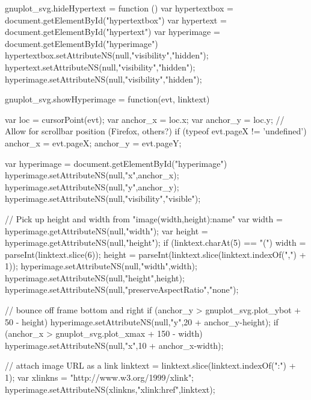 gnuplot_svg.hideHypertext = function ()
{
    var hypertextbox = document.getElementById("hypertextbox")
    var hypertext = document.getElementById("hypertext")
    var hyperimage = document.getElementById("hyperimage")
    hypertextbox.setAttributeNS(null,"visibility","hidden");
    hypertext.setAttributeNS(null,"visibility","hidden");
    hyperimage.setAttributeNS(null,"visibility","hidden");
}

gnuplot_svg.showHyperimage = function(evt, linktext)
{
    var loc = cursorPoint(evt);
    var anchor_x = loc.x;
    var anchor_y = loc.y;
    // Allow for scrollbar position (Firefox, others?)
    if (typeof evt.pageX != 'undefined') {
        anchor_x = evt.pageX; anchor_y = evt.pageY; 
    }

    var hyperimage = document.getElementById("hyperimage")
    hyperimage.setAttributeNS(null,"x",anchor_x);
    hyperimage.setAttributeNS(null,"y",anchor_y);
    hyperimage.setAttributeNS(null,"visibility","visible");

    // Pick up height and width from "image(width,height):name"
    var width = hyperimage.getAttributeNS(null,"width");
    var height = hyperimage.getAttributeNS(null,"height");
    if (linktext.charAt(5) == "(") {
	width = parseInt(linktext.slice(6));
	height = parseInt(linktext.slice(linktext.indexOf(",") + 1));
	hyperimage.setAttributeNS(null,"width",width);
	hyperimage.setAttributeNS(null,"height",height);
	hyperimage.setAttributeNS(null,"preserveAspectRatio","none");
    }

    // bounce off frame bottom and right
    if (anchor_y > gnuplot_svg.plot_ybot + 50 - height)
	hyperimage.setAttributeNS(null,"y",20 + anchor_y-height);
    if (anchor_x > gnuplot_svg.plot_xmax + 150 - width)
	hyperimage.setAttributeNS(null,"x",10 + anchor_x-width);

    // attach image URL as a link
    linktext = linktext.slice(linktext.indexOf(":") + 1);
    var xlinkns = "http://www.w3.org/1999/xlink";
    hyperimage.setAttributeNS(xlinkns,"xlink:href",linktext);
}

